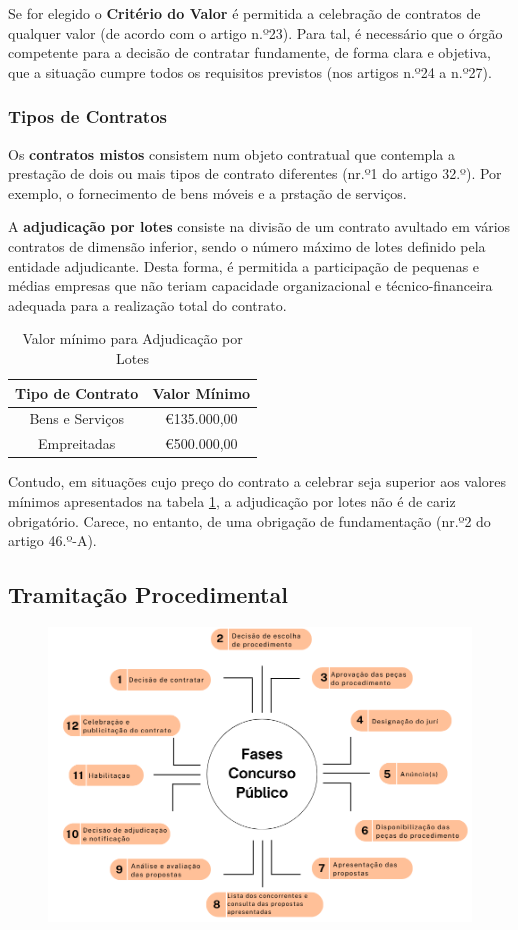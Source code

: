 


Se for elegido o \textbf{Critério do Valor} é permitida a celebração de contratos de qualquer valor (de acordo com o artigo n.º23). Para tal, é necessário que o órgão competente para a decisão de contratar fundamente, de forma clara e objetiva, que a situação cumpre todos os requisitos previstos (nos artigos n.º24 a n.º27).


\subsubsection{Tipos de Contratos}

Os \textbf{contratos mistos} consistem num objeto contratual que contempla a prestação de dois ou mais tipos de contrato diferentes (nr.º1 do artigo 32.º). Por exemplo, o fornecimento de bens móveis e a prstação de serviços.

A \textbf{adjudicação por lotes} consiste na divisão de um contrato avultado em vários contratos de dimensão inferior, sendo o número máximo de lotes definido pela entidade adjudicante. Desta forma, é permitida a participação de pequenas e médias empresas que não teriam capacidade organizacional e técnico-financeira adequada para a realização total do contrato. 

\begin{table}[h!]
	\centering
	\renewcommand{\arraystretch}{1.45}
	\setlength{\tabcolsep}{15pt}
	\begin{tabular}{cc}
		\hline
		\textbf{Tipo de Contrato} & \textbf{Valor Mínimo} \\ \hline
		Bens e Serviços           & €135.000,00           \\
		Empreitadas               & €500.000,00           \\ \hline
	\end{tabular}
	\caption{Valor mínimo para Adjudicação por Lotes}
	\label{tab:5}
\end{table}

Contudo, em situações cujo preço do contrato a celebrar seja superior aos valores mínimos apresentados na tabela \ref{tab:5}, a adjudicação por lotes não é de cariz obrigatório. Carece, no entanto, de uma obrigação de fundamentação (nr.º2 do artigo 46.º-A). 


\subsection{Tramitação Procedimental}




\begin{figure}[H]
	\centering
	\includegraphics[width=\textwidth]{imagens/fasesconcpub.png}
	\caption{}
	\label{}
\end{figure}
